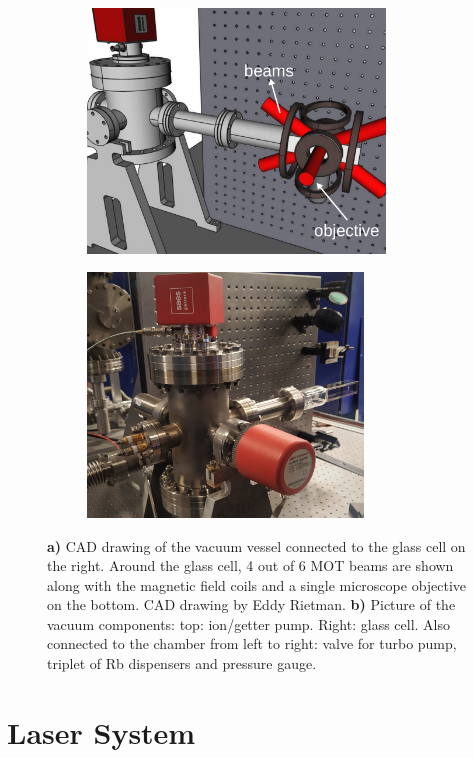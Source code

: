 \begin{figure}
	\begin{subfigure}{.5\linewidth}
		\flushleft
		\includegraphics[height=6.5cm]{figures/CADeditSmall.pdf}
		\caption{}
		\label{fig:VacuumSetup}
	\end{subfigure}
	\hfill
	\begin{subfigure}{.49\linewidth}
		\flushright
		\includegraphics[height=6.5cm]{figures/Chamber.jpg}
		\caption{}
		\label{fig:Chamber}
	\end{subfigure}
	\caption{\textsf{\textbf{a)}} CAD drawing of the vacuum vessel connected to the glass cell on the right. 
	Around the glass cell, 4 out of 6 MOT beams are shown along with the magnetic field coils and a single microscope objective on the bottom. 
	CAD drawing by Eddy Rietman.
    \textsf{\textbf{b)}} Picture of the vacuum components: top: ion/getter pump. Right: glass cell. Also connected to the chamber from left to right: valve for turbo pump, triplet of Rb dispensers and pressure gauge.}
\end{figure}

\section{Laser System}\label{sec:LaserSystem}

